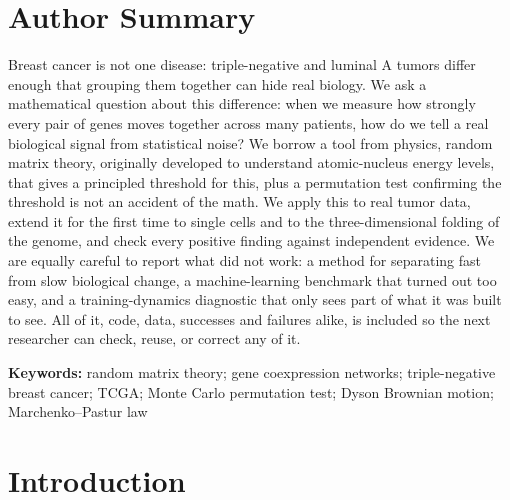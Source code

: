 \documentclass[11pt]{article}
\begin{document}
\section*{Author Summary}
Breast cancer is not one disease: triple-negative and luminal A tumors
differ enough that grouping them together can hide real biology. We
ask a mathematical question about this difference: when we measure how
strongly every pair of genes moves together across many patients, how
do we tell a real biological signal from statistical noise? We borrow
a tool from physics, random matrix theory, originally developed to
understand atomic-nucleus energy levels, that gives a principled
threshold for this, plus a permutation test confirming the threshold
is not an accident of the math. We apply this to real tumor data,
extend it for the first time to single cells and to the
three-dimensional folding of the genome, and check every positive
finding against independent evidence. We are equally careful to
report what did not work: a method for separating fast from slow
biological change, a machine-learning benchmark that turned out too
easy, and a training-dynamics diagnostic that only sees part of what
it was built to see. All of it, code, data, successes and failures
alike, is included so the next researcher can check, reuse, or correct
any of it.

\noindent\textbf{Keywords:} random matrix theory; gene coexpression networks;
triple-negative breast cancer; TCGA; Monte Carlo permutation test;
Dyson Brownian motion; Marchenko--Pastur law

\section{Introduction}
\end{document}
